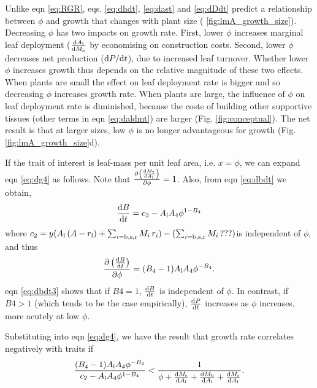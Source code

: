 \documentclass[a4paper,11pt]{article}
\begin{document}
Unlike eqn \ref{eq:RGR}, eqs. \ref{eq:dhdt}, \ref{eq:dast} and \ref{eq:dDdt} predict a relationship between $\phi$ and growth that changes with plant size ( \ref{fig:lmA_growth_size}). Decreasing $\phi$ has two impacts on growth rate. First, lower $\phi$ increases marginal leaf deployment ($\frac{{\rm d}A_{\rm l}}{{\rm d}M_{\rm a}}$ by economising on construction costs. Second, lower $\phi$ decreases net production (${\rm d}P / {\rm d}t$), due to increased leaf turnover. Whether lower $\phi$ increases growth thus depends on the relative magnitude of these two effects. When plants are small the effect on leaf deployment rate is bigger and so decreasing $\phi$ increases growth rate. When plants are large, the influence of $\phi$ on leaf deployment rate is diminished, because the costs of building other supportive tissues (other terms in eqn \ref{eq:daldmt}) are larger (Fig. \ref{fig:conceptual}). The net result is that at larger sizes, low $\phi$ is no longer advantageous for growth (Fig. \ref{fig:lmA_growth_size}d).

If the trait of interest is leaf-mass per unit leaf area, i.e. $x=\phi$, we can expand eqn \ref{eq:dg4} as follows. Note that $\frac{\partial \left(\frac{{\rm d}M_{\rm t}} {{\rm d}A_{\rm l}}\right)}{\partial \phi} = 1$. Also, from eqn \ref{eq:dbdt} we obtain,
\begin{equation}\label{eq:dbdt2}
\frac{{\rm d}B}{{\rm d}t} = c_2 - A_{\rm l} A_4 \phi ^{1-B_4}
\end{equation}
where $c_2 = y ( A_{\rm l} \, (A - r_{\rm l}) + \sum_{i={\rm b,s,r}}{M_{i} \, r_{i}}) - (\sum_{i={\rm b,s,r}}{M_{i} \, ???})$is independent of $\phi$, and thus
\begin{equation}\label{eq:dbdt3}
\frac{\partial \left( \frac{ {\rm d}B} {{\rm d}t}\right)}{\partial \phi}  =
(B_4-1) A_{\rm l} A_4\phi ^{-B_4}.
\end{equation}
eqn \ref{eq:dbdt3} shows that if $B4=1$, $\frac{ {\rm d}B} {{\rm d}t}$ is independent of $\phi$. In contrast, if $B4>1$ (which tends to be the case empirically), $\frac{ {\rm d}P} {{\rm d}t}$ increases as $\phi$ increases, more acutely at low $\phi$.

Substituting into eqn \ref{eq:dg4}, we have the result that growth rate correlates negatively with traits if
\begin{equation} \label{eq:G6}
\frac{(B_4-1) A_{\rm l} A_4\phi ^{-B_4}}{c_2 - A_{\rm l} A_4 \phi ^{1-B_4}}
< \frac{1}{\phi
 + \frac{{\rm d}M_{\rm s}}{{\rm d}A_{\rm l}} + \frac{{\rm d}M_{\rm b}}{{\rm d}A_{\rm l}} + \frac{{\rm d}M_{\rm r}}{{\rm d}A_{\rm l}}}.
\end{equation}
\end{document}
